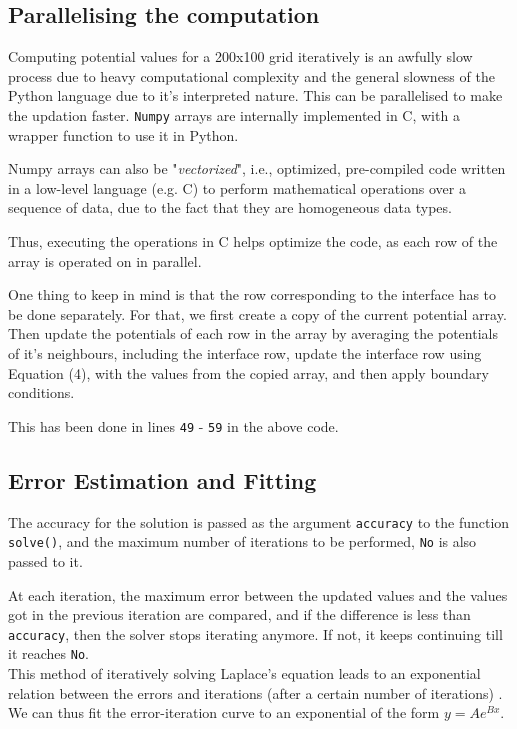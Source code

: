 \documentclass[11pt, a4paper, twoside]{report}
\begin{document}
        \subsection{Parallelising the computation}
            Computing potential values for a 200x100 grid iteratively is an awfully slow process due to heavy computational complexity and the general slowness of the Python language due to it's interpreted nature. This can be parallelised to make the updation faster. \texttt{Numpy} arrays are internally implemented in C, with a wrapper function to use it in Python.

            Numpy arrays can also be "\textit{vectorized}", i.e., optimized, pre-compiled code written in a low-level language (e.g. C) to perform mathematical operations over a sequence of data, due to the fact that they are homogeneous data types.

            Thus, executing the operations in C helps optimize the code, as each row of the array is operated on in parallel.

            One thing to keep in mind is that the row corresponding to the interface has to be done separately. For that, we first create a copy of the current potential array. Then update the potentials of each row in the array by averaging the potentials of it's neighbours, including the interface row, update the interface row using Equation (4), with the values from the copied array, and then apply boundary conditions.

            This has been done in lines \texttt{49} - \texttt{59} in the above code.

        \subsection{Error Estimation and Fitting}
            The accuracy for the solution is passed as the argument \texttt{accuracy} to the function \texttt{solve()}, and the maximum number of iterations to be performed, \texttt{No} is also passed to it.

            At each iteration, the maximum error between the updated values and the values got in the previous iteration are compared, and if the difference is less than \texttt{accuracy}, then the solver stops iterating anymore. If not, it keeps continuing till it reaches \texttt{No}.\\

            This method of iteratively solving Laplace's equation leads to an exponential relation between the errors and iterations (after a certain number of iterations) \cite{Assgn5}. We can thus fit the error-iteration curve to an exponential of the form $y = Ae^{Bx}$.
\end{document}
